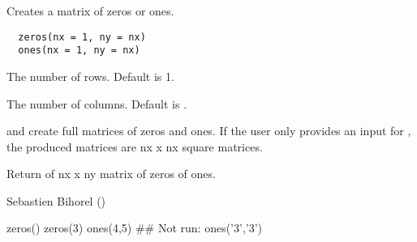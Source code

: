 %
\begin{Description}\relax
Creates a matrix of zeros or ones.
\end{Description}
%
\begin{Usage}
\begin{verbatim}
  zeros(nx = 1, ny = nx)
  ones(nx = 1, ny = nx)
\end{verbatim}
\end{Usage}
%
\begin{Arguments}
\begin{ldescription}
\item[\code{nx}] The number of rows. Default is 1.
\item[\code{ny}] The number of columns. Default is .
\end{ldescription}
\end{Arguments}
%
\begin{Details}\relax
{} and  create full matrices of zeros and ones. If the
user only provides an input for , the produced matrices are nx x nx
square matrices.
\end{Details}
%
\begin{Value}
Return of nx x ny matrix of zeros of ones.
\end{Value}
%
\begin{Author}\relax
Sebastien Bihorel ()
\end{Author}
%
\begin{Examples}
\begin{ExampleCode}
  zeros()
  zeros(3)
  ones(4,5)
  ## Not run: ones('3','3')
\end{ExampleCode}
\end{Examples}
